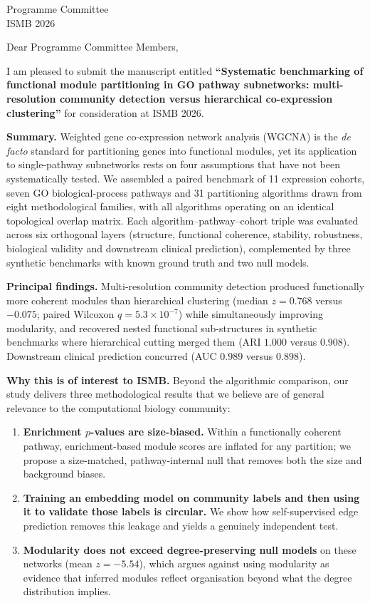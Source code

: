 \documentclass[11pt]{letter}
\begin{document}
\begin{letter}{Programme Committee \\ ISMB 2026}

\opening{Dear Programme Committee Members,}

I am pleased to submit the manuscript entitled \textbf{``Systematic benchmarking of
functional module partitioning in GO pathway subnetworks: multi-resolution community
detection versus hierarchical co-expression clustering''} for consideration at ISMB 2026.

\vspace{6pt}
\noindent\textbf{Summary.} Weighted gene co-expression network analysis (WGCNA) is the
\textit{de facto} standard for partitioning genes into functional modules, yet its
application to single-pathway subnetworks rests on four assumptions that have not been
systematically tested. We assembled a paired benchmark of 11 expression cohorts, seven GO
biological-process pathways and 31 partitioning algorithms drawn from eight methodological
families, with all algorithms operating on an identical topological overlap matrix. Each
algorithm--pathway--cohort triple was evaluated across six orthogonal layers (structure,
functional coherence, stability, robustness, biological validity and downstream clinical
prediction), complemented by three synthetic benchmarks with known ground truth and two
null models.

\vspace{6pt}
\noindent\textbf{Principal findings.} Multi-resolution community detection produced
functionally more coherent modules than hierarchical clustering (median $z = 0.768$ versus
$-0.075$; paired Wilcoxon $q = 5.3\times10^{-7}$) while simultaneously improving modularity,
and recovered nested functional sub-structures in synthetic benchmarks where hierarchical
cutting merged them (ARI $1.000$ versus $0.908$). Downstream clinical prediction concurred
(AUC $0.989$ versus $0.898$).

\vspace{6pt}
\noindent\textbf{Why this is of interest to ISMB.} Beyond the algorithmic comparison, our
study delivers three methodological results that we believe are of general relevance to the
computational biology community:

\begin{enumerate}
\item \textbf{Enrichment $p$-values are size-biased.} Within a functionally coherent
pathway, enrichment-based module scores are inflated for any partition; we propose a
size-matched, pathway-internal null that removes both the size and background biases.
\item \textbf{Training an embedding model on community labels and then using it to validate
those labels is circular.} We show how self-supervised edge prediction removes this leakage
and yields a genuinely independent test.
\item \textbf{Modularity does not exceed degree-preserving null models} on these networks
(mean $z = -5.54$), which argues against using modularity as evidence that inferred modules
reflect organisation beyond what the degree distribution implies.
\end{enumerate}


\end{letter}
\end{document}
